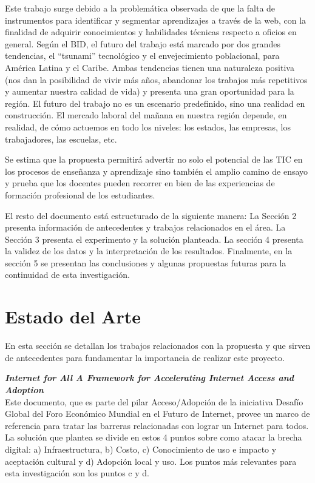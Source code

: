 \documentclass[runningheads]{llncs}
\begin{document}
Este trabajo surge debido a la problemática observada de que la falta de instrumentos para identificar y segmentar aprendizajes a través de la web, con la finalidad de adquirir conocimientos y habilidades técnicas respecto a oficios en general. Según el BID, el futuro del trabajo está marcado por dos grandes tendencias, el “tsunami” tecnológico y el envejecimiento poblacional, para América Latina y el Caribe. Ambas tendencias tienen una naturaleza positiva (nos dan la posibilidad de vivir más años, abandonar los trabajos más repetitivos y aumentar nuestra calidad de vida) y presenta una gran oportunidad para la región. El futuro del trabajo no es un escenario predefinido, sino una realidad en construcción. El mercado laboral del mañana en nuestra región depende, en realidad, de cómo actuemos en todo los niveles: los estados, las empresas, los trabajadores, las escuelas, etc. \cite{3}

Se estima que la propuesta permitirá advertir no solo el potencial de las TIC en los procesos de enseñanza y aprendizaje sino también el amplio camino de ensayo y prueba que los docentes pueden recorrer en bien de las experiencias de formación profesional de los estudiantes. \cite{4}

El resto del documento está estructurado de la siguiente manera: La Sección 2 presenta información de antecedentes y trabajos relacionados en el área. La Sección 3 presenta el experimento y la solución planteada. La sección 4 presenta la validez de los datos y la interpretación de los resultados. Finalmente, en la sección 5 se presentan
las conclusiones y algunas propuestas futuras para la continuidad de esta investigación.


\section{Estado del Arte}

En esta sección se detallan los trabajos relacionados con la propuesta y que sirven de antecedentes para fundamentar la importancia de realizar este proyecto. 

\textbf{\textit{Internet for All A Framework for Accelerating Internet Access and Adoption}}\\
Este documento, que es parte del pilar Acceso/Adopción de la iniciativa Desafío Global del Foro Económico Mundial en el Futuro de Internet, provee un marco de referencia para tratar las barreras relacionadas con lograr un Internet para todos. La solución que plantea se divide en estos 4 puntos sobre como atacar la brecha digital: a) Infraestructura, b) Costo, c) Conocimiento de uso e impacto y aceptación cultural y d) Adopción local y uso. Los puntos más relevantes para esta investigación son los puntos c y d.\cite{5}
\end{document}
